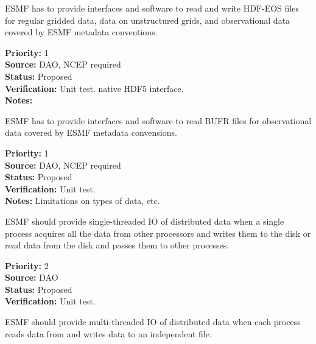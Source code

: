 

ESMF has to provide interfaces and software to read and write HDF-EOS
files for regular gridded data, data on unstructured grids, and observational 
data  covered by ESMF metadata conventions.

\begin{reqlist}
{\bf Priority:} 1 \\
{\bf Source:} DAO, NCEP required \\
{\bf Status:} Proposed \\
{\bf Verification:} Unit test. 
native HDF5 interface. \\
{\bf Notes:}
\end{reqlist}



ESMF has to provide interfaces and software to read BUFR files for
observational data covered by ESMF metadata convensions.

\begin{reqlist}
{\bf Priority:} 1 \\
{\bf Source:} DAO, NCEP required \\
{\bf Status:} Proposed \\
{\bf Verification:} Unit test. \\
{\bf Notes:} Limitations on types of data, etc.
\end{reqlist}





ESMF should provide single-threaded IO of distributed data when a
single process acquires all the data from other processors and writes
them to the disk or read data from the disk and passes them to other 
processes. 


\begin{reqlist}
{\bf Priority:} 2 \\
{\bf Source:} DAO \\
{\bf Status:} Proposed \\
{\bf Verification:} Unit test.
\end{reqlist}




ESMF should provide multi-threaded IO of distributed data when each
process reads data from and writes data to an independent file. 


